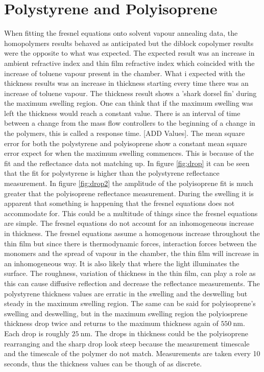 \documentclass[MasterThesisMain.tex]{subfiles}
\begin{document}
\section{Polystyrene and Polyisoprene}
When fitting the fresnel equations onto solvent vapour annealing data, the homopolymers results behaved as anticipated but the diblock copolymer results were the opposite to what was expected. The expected result was an increase in ambient refractive index and thin film refractive index which coincided with the increase of toluene vapour present in the chamber. What i expected with the thickness results was an increase in thickness starting every time there was an increase of toluene vapour. The thickness result shows a 'shark dorsel fin' during the maximum swelling region. One can think that if the maximum swelling was left the thickness would reach a constant value. There is an interval of time between a change from the mass flow controllers to the beginning of a change in the polymers, this is called a response time. [ADD Values]. The mean square error for both the polystyrene and polyisoprene show a constant mean square error expect for when the maximum swelling commences. This is because of the fit and the reflectance data not matching up. In figure \ref{fig:drop} it can be seen that the fit for polystyrene is higher than the polystyrene reflectance measurement. In figure \ref{fig:drop2} the amplitude of the polyisoprene fit is much greater that the polyisoprene reflectance measurement. During the swelling it is apparent that something is happening that the fresnel equations does not accommodate for. This could be a multitude of things since the fresnel equations are simple. The fresnel equations do not account for an inhomogeneous increase in thickness. The fresnel equations assume a homogenous increase throughout the thin film but since there is thermodynamic forces, interaction forces between the monomers and the spread of vapour in the chamber, the thin film will increase in an inhomogeneous way. It is also likely that where the light illuminates the surface. The roughness, variation of thickness in the thin film, can play a role as this can cause diffusive reflection and decrease the reflectance measurements. The polystyrene thickness values are erratic in the swelling and the deswelling but steady in the maximum swelling region. The same can be said for polyisoprene's swelling and deswelling, but in the maximum swelling region the polyiosprene thickness drop twice and returns to the maximum thickness again of $\SI{550}{\nano\meter}$. Each drop is roughly $\SI{25}{\nano\meter}$. The drops in thickness could be the polyisoprene rearranging and the sharp drop look steep because the measurement timescale and the timescale of the polymer do not match. Measurements are taken every 10 seconds, thus the thickness values can be though of as discrete.
\end{document}

